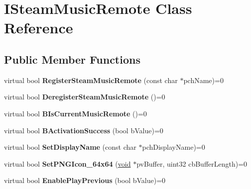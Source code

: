 \hypertarget{classISteamMusicRemote}{}\section{I\+Steam\+Music\+Remote Class Reference}
\label{classISteamMusicRemote}
\subsection*{Public Member Functions}
\begin{DoxyCompactItemize}
\item 
\hypertarget{classISteamMusicRemote_a4f14bf3728b1aef717c9c5f74a3e3f03}{}virtual bool {\bfseries Register\+Steam\+Music\+Remote} (const char $\ast$pch\+Name)=0\label{classISteamMusicRemote_a4f14bf3728b1aef717c9c5f74a3e3f03}

\item 
\hypertarget{classISteamMusicRemote_a0df5003b1fe9493eef1ac245681e101b}{}virtual bool {\bfseries Deregister\+Steam\+Music\+Remote} ()=0\label{classISteamMusicRemote_a0df5003b1fe9493eef1ac245681e101b}

\item 
\hypertarget{classISteamMusicRemote_ae5f3636e82985e04027eb9c68bf49ed9}{}virtual bool {\bfseries B\+Is\+Current\+Music\+Remote} ()=0\label{classISteamMusicRemote_ae5f3636e82985e04027eb9c68bf49ed9}

\item 
\hypertarget{classISteamMusicRemote_ab3cfb4d32e23481cc0f2961e3dace5ad}{}virtual bool {\bfseries B\+Activation\+Success} (bool b\+Value)=0\label{classISteamMusicRemote_ab3cfb4d32e23481cc0f2961e3dace5ad}

\item 
\hypertarget{classISteamMusicRemote_a2e27a91a02fa4592cbedf32c6506feb1}{}virtual bool {\bfseries Set\+Display\+Name} (const char $\ast$pch\+Display\+Name)=0\label{classISteamMusicRemote_a2e27a91a02fa4592cbedf32c6506feb1}

\item 
\hypertarget{classISteamMusicRemote_a62a57c03c0862b98f66a7b6ef6c23c32}{}virtual bool {\bfseries Set\+P\+N\+G\+Icon\+\_\+64x64} (\hyperlink{SDL__audio_8h_a52835ae37c4bb905b903cbaf5d04b05f}{void} $\ast$pv\+Buffer, uint32 cb\+Buffer\+Length)=0\label{classISteamMusicRemote_a62a57c03c0862b98f66a7b6ef6c23c32}

\item 
\hypertarget{classISteamMusicRemote_a7dbef87ee956a98ebd422bc7edb094d6}{}virtual bool {\bfseries Enable\+Play\+Previous} (bool b\+Value)=0\label{classISteamMusicRemote_a7dbef87ee956a98ebd422bc7edb094d6}


\end{DoxyCompactItemize}
